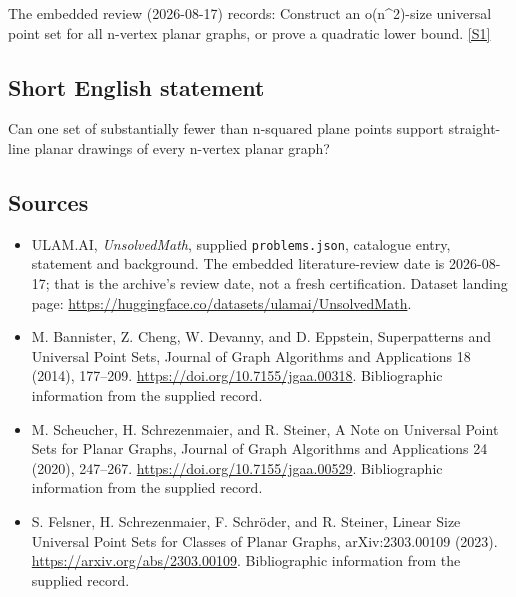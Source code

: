 \documentclass[11pt,a4paper]{article}
\newcommand{\sref}[2]{\hyperlink{source:#1:#2}{[S#2]}}
\begin{document}
The embedded review (2026-08-17) records: Construct an o(n\textasciicircum{}2)-size universal point set for all n-vertex planar graphs, or prove a quadratic lower bound. \sref{statement}{1}

\subsection{Short English statement}

Can one set of substantially fewer than n-squared plane points support straight-line planar drawings of every n-vertex planar graph?

\subsection{Sources}

{\small

\begin{itemize}

\item[\hypertarget{source:statement:1}{S1}] ULAM.AI, \emph{UnsolvedMath}, supplied \texttt{problems.json}, catalogue entry, statement and background. The embedded literature-review date is 2026-08-17; that is the archive’s review date, not a fresh certification. Dataset landing page: \url{https://huggingface.co/datasets/ulamai/UnsolvedMath}.

\item[\hypertarget{source:statement:2}{S2}] M. Bannister, Z. Cheng, W. Devanny, and D. Eppstein, Superpatterns and Universal Point Sets, Journal of Graph Algorithms and Applications 18 (2014), 177–209. \url{https://doi.org/10.7155/jgaa.00318}. Bibliographic information from the supplied record.

\item[\hypertarget{source:statement:3}{S3}] M. Scheucher, H. Schrezenmaier, and R. Steiner, A Note on Universal Point Sets for Planar Graphs, Journal of Graph Algorithms and Applications 24 (2020), 247–267. \url{https://doi.org/10.7155/jgaa.00529}. Bibliographic information from the supplied record.

\item[\hypertarget{source:statement:4}{S4}] S. Felsner, H. Schrezenmaier, F. Schröder, and R. Steiner, Linear Size Universal Point Sets for Classes of Planar Graphs, arXiv:2303.00109 (2023). \url{https://arxiv.org/abs/2303.00109}. Bibliographic information from the supplied record.

\end{itemize}

}

\label{end:statement}
\end{document}
